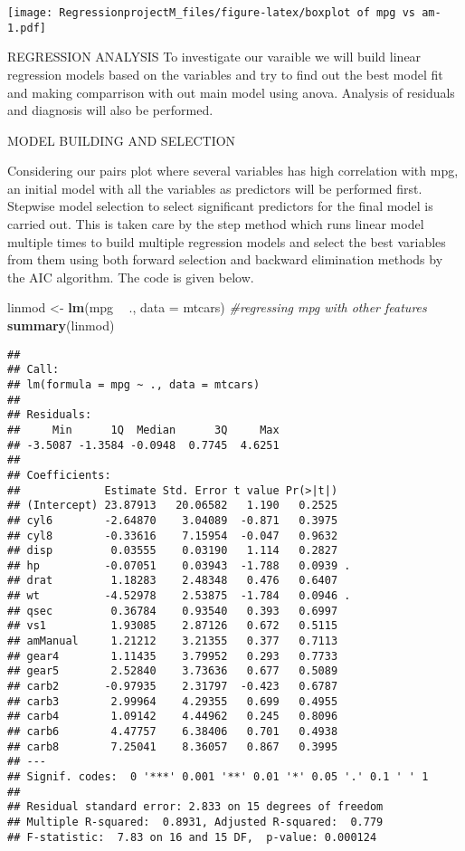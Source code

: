 \documentclass[
]{article}
\newenvironment{Shaded}{\begin{snugshade}}{\end{snugshade}}
\newcommand{\CommentTok}[1]{\textcolor[rgb]{0.56,0.35,0.01}{\textit{#1}}}
\newcommand{\DataTypeTok}[1]{\textcolor[rgb]{0.13,0.29,0.53}{#1}}
\newcommand{\KeywordTok}[1]{\textcolor[rgb]{0.13,0.29,0.53}{\textbf{#1}}}
\newcommand{\NormalTok}[1]{#1}
\newcommand{\OperatorTok}[1]{\textcolor[rgb]{0.81,0.36,0.00}{\textbf{#1}}}
\newcommand{\StringTok}[1]{\textcolor[rgb]{0.31,0.60,0.02}{#1}}
\begin{document}
\texttt{[image: RegressionprojectM\_files/figure-latex/boxplot of mpg vs am-1.pdf]}

REGRESSION ANALYSIS To investigate our varaible we will build linear
regression models based on the variables and try to find out the best
model fit and making comparrison with out main model using anova.
Analysis of residuals and diagnosis will also be performed.

MODEL BUILDING AND SELECTION

Considering our pairs plot where several variables has high correlation
with mpg, an initial model with all the variables as predictors will be
performed first. Stepwise model selection to select significant
predictors for the final model is carried out. This is taken care by the
step method which runs linear model multiple times to build multiple
regression models and select the best variables from them using both
forward selection and backward elimination methods by the AIC algorithm.
The code is given below.

\begin{Shaded}
\begin{Highlighting}[]
\NormalTok{linmod <-}\StringTok{ }\KeywordTok{lm}\NormalTok{(mpg }\OperatorTok{~}\StringTok{ }\NormalTok{., }\DataTypeTok{data =}\NormalTok{ mtcars) }\CommentTok{#regressing mpg with other features}
\KeywordTok{summary}\NormalTok{(linmod)}
\end{Highlighting}
\end{Shaded}

\begin{verbatim}
## 
## Call:
## lm(formula = mpg ~ ., data = mtcars)
## 
## Residuals:
##     Min      1Q  Median      3Q     Max 
## -3.5087 -1.3584 -0.0948  0.7745  4.6251 
## 
## Coefficients:
##             Estimate Std. Error t value Pr(>|t|)  
## (Intercept) 23.87913   20.06582   1.190   0.2525  
## cyl6        -2.64870    3.04089  -0.871   0.3975  
## cyl8        -0.33616    7.15954  -0.047   0.9632  
## disp         0.03555    0.03190   1.114   0.2827  
## hp          -0.07051    0.03943  -1.788   0.0939 .
## drat         1.18283    2.48348   0.476   0.6407  
## wt          -4.52978    2.53875  -1.784   0.0946 .
## qsec         0.36784    0.93540   0.393   0.6997  
## vs1          1.93085    2.87126   0.672   0.5115  
## amManual     1.21212    3.21355   0.377   0.7113  
## gear4        1.11435    3.79952   0.293   0.7733  
## gear5        2.52840    3.73636   0.677   0.5089  
## carb2       -0.97935    2.31797  -0.423   0.6787  
## carb3        2.99964    4.29355   0.699   0.4955  
## carb4        1.09142    4.44962   0.245   0.8096  
## carb6        4.47757    6.38406   0.701   0.4938  
## carb8        7.25041    8.36057   0.867   0.3995  
## ---
## Signif. codes:  0 '***' 0.001 '**' 0.01 '*' 0.05 '.' 0.1 ' ' 1
## 
## Residual standard error: 2.833 on 15 degrees of freedom
## Multiple R-squared:  0.8931, Adjusted R-squared:  0.779 
## F-statistic:  7.83 on 16 and 15 DF,  p-value: 0.000124
\end{verbatim}
\end{document}
